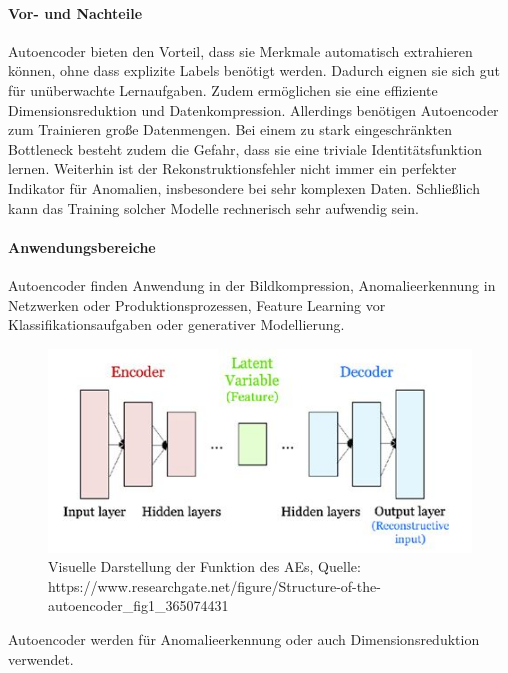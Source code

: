 \documentclass[a4paper,12pt]{article}
\begin{document}
	\paragraph{Vor- und Nachteile}
	Autoencoder bieten den Vorteil, dass sie Merkmale automatisch extrahieren können, ohne dass explizite Labels benötigt werden. Dadurch eignen sie sich gut für unüberwachte Lernaufgaben. Zudem ermöglichen sie eine effiziente Dimensionsreduktion und Datenkompression. Allerdings benötigen Autoencoder zum Trainieren große Datenmengen. Bei einem zu stark eingeschränkten Bottleneck besteht zudem die Gefahr, dass sie eine triviale Identitätsfunktion lernen. Weiterhin ist der Rekonstruktionsfehler nicht immer ein perfekter Indikator für Anomalien, insbesondere bei sehr komplexen Daten. Schließlich kann das Training solcher Modelle rechnerisch sehr aufwendig sein.
	
	\paragraph{Anwendungsbereiche}
	Autoencoder finden Anwendung in der Bildkompression, Anomalieerkennung in Netzwerken oder Produktionsprozessen, Feature Learning vor Klassifikationsaufgaben oder generativer Modellierung.
	
	\begin{figure}[H]
		\centering
		\includegraphics[width=0.7\linewidth]{screenshot004}
		\caption{Visuelle Darstellung der Funktion des AEs, Quelle: https://www.researchgate.net/figure/Structure-of-the-autoencoder\_fig1\_365074431}
		\label{fig:screenshot004}
	\end{figure}
	
	Autoencoder werden für Anomalieerkennung oder auch Dimensionsreduktion verwendet.
	
\end{document}
